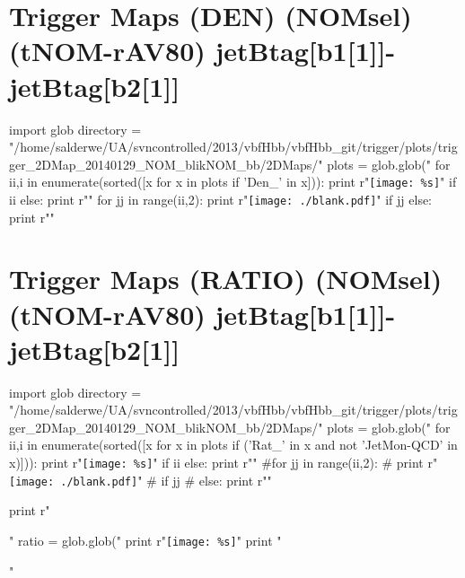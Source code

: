 \documentclass[12pt,english,dvipsnames]{beamer}
\newcommand{\UAoverlay}[0]{%
\begin{tikzpicture}[remember picture,overlay,shift={(current page.north east)}]
\node (zero) at (-1.8cm,-0.93cm) {\texttt{[image: ../logos/CMS.pdf]}\hspace{0.15cm}\texttt{[image: ../logos/CERN.pdf]}\hspace{0.15cm}\texttt{[image: ../logos/UA.pdf]}}; 
\end{tikzpicture}
}
\begin{document}
\section{Trigger Maps (DEN) (NOMsel) (tNOM-rAV80) jetBtag[b1[1]]-jetBtag[b2[1]]}
\begin{frame}[t,fragile]%
\begin{python}
import glob
directory = "/home/salderwe/UA/svncontrolled/2013/vbfHbb/vbfHbb_git/trigger/plots/trigger_2DMap_20140129_NOM_blikNOM_bb/2DMaps/"
plots = glob.glob("%
for ii,i in enumerate(sorted([x for x in plots if 'Den_' in x])):
  print r"\texttt{[image: \%s]}"%
  if ii%
  else: print r"\hfill"
for jj in range(ii,2):
  print r"\texttt{[image: ./blank.pdf]}"
  if jj%
  else: print r"\hfill"
\end{python} 
\end{frame}
\section{Trigger Maps (RATIO) (NOMsel) (tNOM-rAV80) jetBtag[b1[1]]-jetBtag[b2[1]]}
\begin{frame}[t,fragile]%
\begin{python}
import glob
directory = "/home/salderwe/UA/svncontrolled/2013/vbfHbb/vbfHbb_git/trigger/plots/trigger_2DMap_20140129_NOM_blikNOM_bb/2DMaps/"
plots = glob.glob("%
for ii,i in enumerate(sorted([x for x in plots if ('Rat_' in x and not 'JetMon-QCD' in x)])):
  print r"\texttt{[image: \%s]}"%
  if ii%
  else: print r"\hfill"
#for jj in range(ii,2):
#  print r"\texttt{[image: ./blank.pdf]}"
#  if jj%
#  else: print r"\hfill"
  
print r"\begin{minipage}{0.9999\textwidth}\centering"
ratio = glob.glob("%
print r"\texttt{[image: \%s]}"%
print "\end{minipage}"
\end{python} 
\end{frame}
\end{document}
